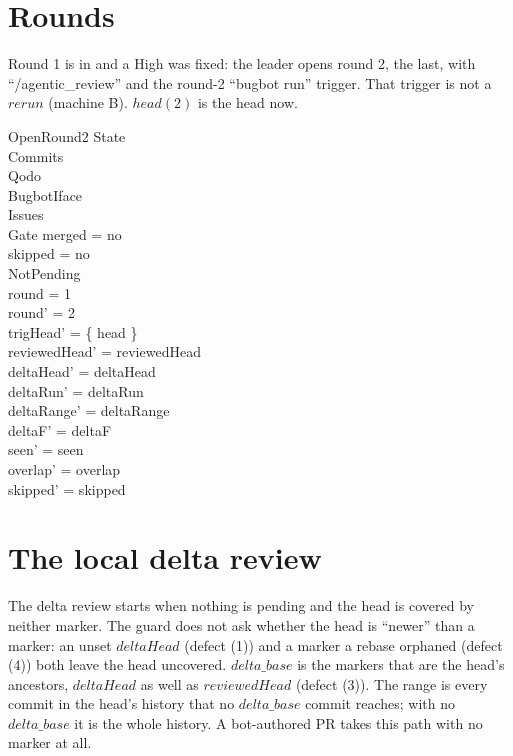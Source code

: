 \documentclass{article}
\begin{document}
\section{Rounds}

Round 1 is in and a High was fixed: the leader opens round 2, the last, with
``/agentic\_review'' and the round-2 ``bugbot run'' trigger. That trigger is not
a $rerun$ (machine B). $head(2)$ is the head now.

\begin{schema}{OpenRound2}
  \Delta State \\
  \Xi Commits \\
  \Xi Qodo \\
  \Xi BugbotIface \\
  \Xi Issues \\
  \Xi Gate
\where
  merged = no \\
  skipped = no \\
  NotPending \\
  round = 1 \\
  round' = 2 \\
  trigHead' = \{ head \} \\
  reviewedHead' = reviewedHead \\
  deltaHead' = deltaHead \\
  deltaRun' = deltaRun \\
  deltaRange' = deltaRange \\
  deltaF' = deltaF \\
  seen' = seen \\
  overlap' = overlap \\
  skipped' = skipped
\end{schema}

\section{The local delta review}

The delta review starts when nothing is pending and the head is covered by
neither marker. The guard does not ask whether the head is ``newer'' than a
marker: an unset $deltaHead$ (defect (1)) and a marker a rebase orphaned
(defect (4)) both leave the head uncovered. $delta\_base$ is the markers that
are the head's ancestors, $deltaHead$ as well as $reviewedHead$ (defect (3)).
The range is every commit in the head's history that no $delta\_base$ commit
reaches; with no $delta\_base$ it is the whole history. A bot-authored PR takes
this path with no marker at all.
\end{document}
